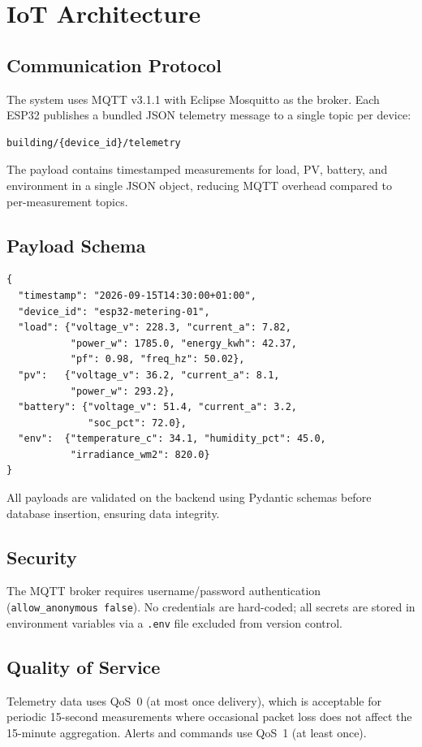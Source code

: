 \chapter{IoT Architecture}
\label{ch:iot}

\section{Communication Protocol}

The system uses MQTT v3.1.1 with Eclipse Mosquitto as the broker. Each ESP32 publishes a bundled JSON telemetry message to a single topic per device:

\begin{verbatim}
building/{device_id}/telemetry
\end{verbatim}

The payload contains timestamped measurements for load, PV, battery, and environment in a single JSON object, reducing MQTT overhead compared to per-measurement topics.

\section{Payload Schema}

\begin{lstlisting}
{
  "timestamp": "2026-09-15T14:30:00+01:00",
  "device_id": "esp32-metering-01",
  "load": {"voltage_v": 228.3, "current_a": 7.82,
           "power_w": 1785.0, "energy_kwh": 42.37,
           "pf": 0.98, "freq_hz": 50.02},
  "pv":   {"voltage_v": 36.2, "current_a": 8.1,
           "power_w": 293.2},
  "battery": {"voltage_v": 51.4, "current_a": 3.2,
              "soc_pct": 72.0},
  "env":  {"temperature_c": 34.1, "humidity_pct": 45.0,
           "irradiance_wm2": 820.0}
}
\end{lstlisting}

All payloads are validated on the backend using Pydantic schemas before database insertion, ensuring data integrity.

\section{Security}

The MQTT broker requires username/password authentication (\texttt{allow\_anonymous false}). No credentials are hard-coded; all secrets are stored in environment variables via a \texttt{.env} file excluded from version control.

\section{Quality of Service}

Telemetry data uses QoS~0 (at most once delivery), which is acceptable for periodic 15-second measurements where occasional packet loss does not affect the 15-minute aggregation. Alerts and commands use QoS~1 (at least once).
